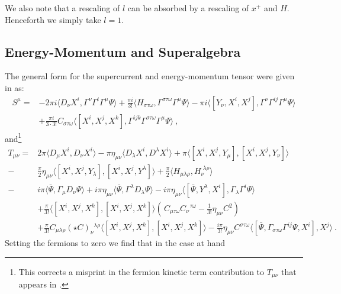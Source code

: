 \documentclass[12pt]{article}
\numberwithin{equation}{section}
\begin{document}
 
We also note that a rescaling of $l$ can be absorbed by a rescaling of $x^+$ and $H$. Henceforth we simply take $l=1$.

\subsection{Energy-Momentum and Superalgebra}

The general form for the supercurrent and energy-momentum tensor were given in \cite{Lambert:2016xbs} as:\begin{align}
S^\mu=&-2\pi i\langle D_\nu X^i ,\Gamma^\nu\Gamma^i\Gamma^\mu \Psi\rangle+\frac{\pi i}{3!} \langle H_{\sigma\tau\omega},\Gamma^{\sigma\tau\omega}\Gamma^\mu\Psi\rangle-\pi i\langle[Y_\nu,X^i,X^j],\Gamma^\nu\Gamma^{ij}\Gamma^\mu\Psi\rangle\nonumber\\ &+\frac{\pi i}{3\cdot 3!}C_{\sigma\tau\omega}\langle[X^i,X^j,X^k],\Gamma^{ijk}\Gamma^{\sigma\tau\omega}\Gamma^\mu\Psi\rangle\ ,
 \end{align}
 and\footnote{This corrects a misprint in the fermion kinetic term contribution to $T_{\mu\nu}$ that appears in \cite{Lambert:2016xbs}.} \begin{align}
T_{\mu\nu}=&2\pi\langle D_\mu X^i,D_\nu X^i\rangle-\pi\eta_{\mu\nu} \langle D_\lambda X^i,D^\lambda X^i\rangle+\pi\langle[X^i,X^j,Y_\mu],[X^i,X^j,Y_\nu]\rangle\nonumber\\
-&\frac{\pi}{2}\eta_{\mu\nu}\langle[X^i,X^j,Y_\lambda],[X^i,X^j,Y^\lambda]\rangle+\frac{\pi}{2}\langle H_{\mu\lambda\rho},H_\nu^{\,\,\lambda\rho}\rangle\nonumber\\
-& i\pi\langle \bar \Psi,\Gamma_\mu D_\nu\Psi\rangle +i\pi\eta_{\mu\nu}\langle\bar \Psi,\Gamma^\lambda D_\lambda \Psi\rangle-i\pi\eta_{\mu\nu}\langle[\bar \Psi,Y^\lambda,X^i],\Gamma_\lambda\Gamma^i\Psi\rangle\nonumber\\
&+\frac{\pi}{3!}\langle[X^i,X^j,X^k],[X^i,X^j,X^k]\rangle( \,C_{\mu\tau\omega}C_\nu^{\,\,\,\,\tau\omega}-\frac{1}{3!}\eta_{\mu\nu}C^2)\nonumber\\
&+\frac{\pi}{3!}C_{\mu\lambda\rho}(\star C)_{\nu}{}^{\lambda\rho}\langle[X^i,X^j,X^k],[X^i,X^j,X^k]\rangle-\frac{i\pi }{ 3!}\eta_{\mu\nu}C^{\sigma\tau\omega}\langle[\bar{\Psi},\Gamma_{\sigma\tau\omega}\Gamma^{ij}\Psi,X^i ],X^{j}\rangle\ .
\end{align}
Setting the fermions to zero we find that in the case at hand
\end{document}
